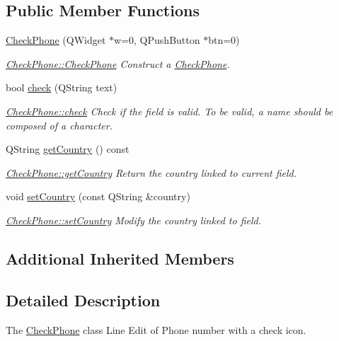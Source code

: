 \subsection*{Public Member Functions}
\begin{DoxyCompactItemize}
\item 
\hyperlink{classCheckPhone_a491bceb9add48e7668162fc8ec511550}{Check\-Phone} (Q\-Widget $\ast$w=0, Q\-Push\-Button $\ast$btn=0)
\begin{DoxyCompactList}\small\item\em \hyperlink{classCheckPhone_a491bceb9add48e7668162fc8ec511550}{Check\-Phone\-::\-Check\-Phone} Construct a \hyperlink{classCheckPhone}{Check\-Phone}. \end{DoxyCompactList}\item 
bool \hyperlink{classCheckPhone_ac60f1428fc89e1b2630db022e14509ed}{check} (Q\-String text)
\begin{DoxyCompactList}\small\item\em \hyperlink{classCheckPhone_ac60f1428fc89e1b2630db022e14509ed}{Check\-Phone\-::check} Check if the field is valid. To be valid, a name should be composed of a character. \end{DoxyCompactList}\item 
Q\-String \hyperlink{classCheckPhone_a3dd528db0e731b23df0524e41415d05e}{get\-Country} () const 
\begin{DoxyCompactList}\small\item\em \hyperlink{classCheckPhone_a3dd528db0e731b23df0524e41415d05e}{Check\-Phone\-::get\-Country} Return the country linked to current field. \end{DoxyCompactList}\item 
void \hyperlink{classCheckPhone_a2a4a30d0a69611f72c539cc17919ccc9}{set\-Country} (const Q\-String \&country)
\begin{DoxyCompactList}\small\item\em \hyperlink{classCheckPhone_a2a4a30d0a69611f72c539cc17919ccc9}{Check\-Phone\-::set\-Country} Modify the {\itshape country} linked to field. \end{DoxyCompactList}\end{DoxyCompactItemize}
\subsection*{Additional Inherited Members}


\subsection{Detailed Description}
The \hyperlink{classCheckPhone}{Check\-Phone} class Line Edit of Phone number with a check icon. 

